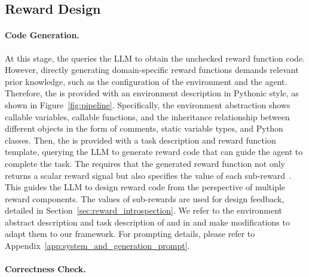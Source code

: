\documentclass{article}
\theoremstyle{plain}
\theoremstyle{definition}
\theoremstyle{remark}
\begin{document}
\subsection{Reward Design}\label{sec:reward_design}

\paragraph{Code Generation.}

At this stage, the \designer queries the LLM to obtain the unchecked reward function code. However, directly generating domain-specific reward functions demands relevant prior knowledge, such as the configuration of the environment and the agent. Therefore, the \designer is provided with an environment description in Pythonic style, as shown in Figure~\ref{fig:pipeline}. Specifically, the environment abstraction shows callable variables, callable functions, and the inheritance relationship between different objects in the form of comments, static variable types, and Python classes.
Then, the \designer is provided with a task description and reward function template, querying the LLM to generate reward code that can guide the agent to complete the task. The \designer requires that the generated reward function not only returns a scalar reward signal but also specifies the value of each sub-reward~\cite{Eureka}. This guides the LLM to design reward code from the perspective of multiple reward components. The values of sub-rewards are used for \critic design feedback, detailed in Section~\ref{sec:reward_introspection}. We refer to the environment abstract description and task description of \MW and \MS in \cite{Text2Reward} and make
modifications to adapt them to our framework. For prompting details, please refer to Appendix~\ref{app:system_and_generation_prompt}.

\paragraph{Correctness Check.}
\end{document}
